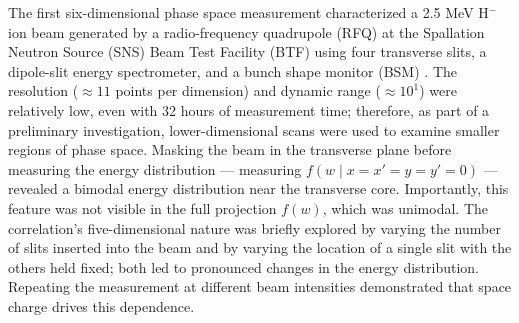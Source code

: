 \documentclass[%
 reprint,
 amsmath,amssymb,
 aps,
prstab,
]{revtex4-2}
\begin{document}
The first six-dimensional phase space measurement characterized a 2.5 MeV H$^-$ ion beam generated by a radio-frequency quadrupole (RFQ) at the Spallation Neutron Source (SNS) Beam Test Facility (BTF) using four transverse slits, a dipole-slit energy spectrometer, and a bunch shape monitor (BSM) \cite{Cathey2018}. The resolution ($\approx 11$ points per dimension) and dynamic range ($\approx 10^1$) were relatively low, even with 32 hours of measurement time; therefore, as part of a preliminary investigation, lower-dimensional scans were used to examine smaller regions of phase space. Masking the beam in the transverse plane before measuring the energy distribution --- measuring $f(w \mid x{=}x'{=}y{=}y'{=}0)$ --- revealed a bimodal energy distribution near the transverse core. Importantly, this feature was not visible in the full projection $f(w)$, which was unimodal. The correlation's five-dimensional nature was briefly explored by varying the number of slits inserted into the beam and by varying the location of a single slit with the others held fixed; both led to pronounced changes in the energy distribution. Repeating the measurement at different beam intensities demonstrated that space charge drives this dependence.

\end{document}
